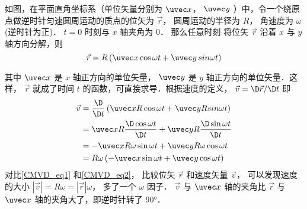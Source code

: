 

如图，在平面直角坐标系（单位矢量分别为 $\uvec x$，  $\uvec y$ ）中，令一个绕原点做逆时针匀速圆周运动的质点的位矢为 $\vec r$， 圆周运动的半径为 $R$， 角速度为 $\omega $ (逆时针为正)． $t = 0$ 时刻与 $x$ 轴夹角为 $0$． 那么任意时刻 将位矢 $\vec r$ 沿着 $x$ 与 $y$ 轴方向分解，则
\begin{equation}\label{CMVD_eq1}
\vec r = R\left( {\uvec x\cos \omega t + \uvec y\,sin\omega t} \right)
\end{equation}

其中 $\uvec x$ 是 $x$ 轴正方向的单位矢量， $\uvec y$ 是 $y$ 轴正方向的单位矢量．这样， $\vec r$ 就成了时间 $t$ 的函数，可直接求导．根据速度的定义， $\vec v = \D\vec r / \D t$ 即
\begin{equation}\label{CMVD_eq2}
\begin{split}
\vec v &= \frac{\D}{{\D t}}\left( {\uvec xR\cos \omega t + \uvec yRsin\omega t} \right)\\
 &= \uvec xR\frac{{\D\cos \omega t}}{{\D t}} + \uvec yR\frac{{\D\sin \omega t}}{{\D t}}\\
 &= - \uvec xR\omega \sin \omega t + \uvec yR\omega \cos \omega t\\
 &= R\omega \left( { - \uvec x\sin \omega t + \uvec y\cos \omega t} \right)
\end{split}
\end{equation}
对比\autoref{CMVD_eq1} 和\autoref{CMVD_eq2}， 比较位矢 $\vec r$ 和速度矢量 $\vec v$， 可以发现速度的大小 $\left| {\vec v} \right| = R\omega  = \left| {\vec r} \right|\omega $， 多了一个 $\omega $ 因子． $\vec v$ 与 $\uvec x$ 轴的夹角比 $\vec r$ 与 $\uvec x$ 轴的夹角大了，即逆时针转了 $90°$． 

